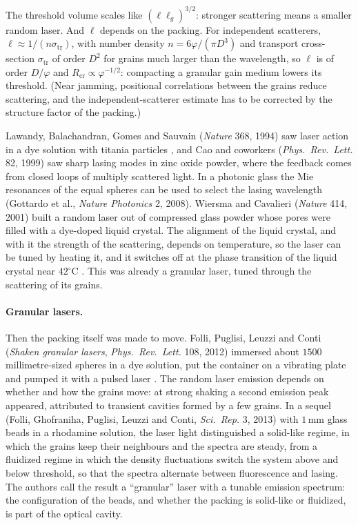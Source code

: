 \documentclass[11pt,openany]{book}
\theoremstyle{plain}
\theoremstyle{definition}
\theoremstyle{remark}
\begin{document}
The threshold volume scales like $(\ell\ell_g)^{3/2}$: stronger scattering means a smaller random laser.
And $\ell$ depends on the packing. For independent scatterers, $\ell\approx1/(n\sigma_{\mathrm{tr}})$, with
number density $n=6\varphi/(\pi D^3)$ and transport cross-section $\sigma_{\mathrm{tr}}$ of order $D^2$ for grains
much larger than the wavelength, so $\ell$ is of order $D/\varphi$ and $R_{\mathrm{cr}}\propto\varphi^{-1/2}$: compacting a
granular gain medium lowers its threshold. (Near jamming, positional correlations between the grains
reduce scattering, and the independent-scatterer estimate has to be corrected by the structure factor of
the packing.)

Lawandy, Balachandran, Gomes and Sauvain (\emph{Nature} 368, 1994) saw laser action in a dye solution
with titania particles , and Cao and coworkers (\emph{Phys.\ Rev.\ Lett.} 82, 1999) saw
sharp lasing modes in zinc oxide powder, where the feedback comes from closed loops of multiply scattered
light. In a photonic glass the Mie resonances of the equal spheres can be used to select the lasing
wavelength (Gottardo et al., \emph{Nature Photonics} 2, 2008). Wiersma and Cavalieri (\emph{Nature} 414, 2001) built a random laser out
of compressed glass powder whose pores were filled with a dye-doped liquid crystal. The alignment of the
liquid crystal, and with it the strength of the scattering, depends on temperature, so the laser can be
tuned by heating it, and it switches off at the phase transition of the liquid crystal near $42^\circ$C
. This was already a granular laser, tuned through the scattering of its grains.

\paragraph{Granular lasers.} Then the packing itself was made to move. Folli, Puglisi, Leuzzi and Conti
(\emph{Shaken granular lasers}, \emph{Phys.\ Rev.\ Lett.} 108, 2012) immersed about $1500$ millimetre-sized
spheres in a dye solution, put the container on a vibrating plate and pumped it with a pulsed laser
. The random laser emission depends on whether and how the grains move: at strong
shaking a second emission peak appeared, attributed to transient cavities formed by a few grains. In
a sequel (Folli, Ghofraniha, Puglisi, Leuzzi and Conti, \emph{Sci.\ Rep.} 3, 2013) with $1$\,mm glass
beads in a rhodamine solution, the laser light distinguished a solid-like regime, in which the grains keep
their neighbours and the spectra are steady, from a fluidized regime in which the density fluctuations
switch the system above and below threshold, so that the spectra alternate between fluorescence and lasing.
The authors call the result a ``granular'' laser with a tunable emission spectrum: the configuration of
the beads, and whether the packing is solid-like or fluidized, is part of the optical cavity.
\end{document}
